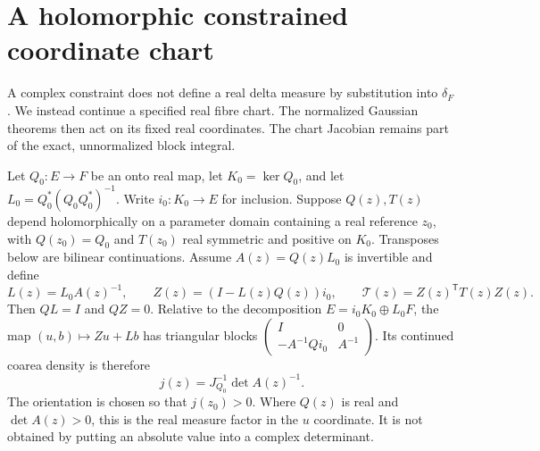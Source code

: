 \documentclass[11pt,letterpaper,reqno]{amsart}
\numberwithin{equation}{section}
\theoremstyle{definition}
\theoremstyle{remark}
\begin{document}
\section{A holomorphic constrained coordinate chart}
\label{gi:sec-complex-chart}

A complex constraint does not define a real delta measure by
substitution into $\delta_F$. We instead continue a specified
real fibre chart. The normalized Gaussian theorems then act on
its fixed real coordinates. The chart Jacobian remains part of
the exact, unnormalized block integral.

Let $Q_0:E\to F$ be an onto real map, let $K_0=\ker Q_0$,
and let $L_0=Q_0^*(Q_0Q_0^*)^{-1}$. Write $i_0:K_0\to E$
for inclusion. Suppose $Q(z),T(z)$ depend holomorphically
on a parameter domain containing a real reference $z_0$,
with $Q(z_0)=Q_0$ and $T(z_0)$ real symmetric and positive
on $K_0$. Transposes below are bilinear continuations.
Assume $A(z)=Q(z)L_0$ is invertible and define
\begin{equation}\label{gi:eq-complex-fibre-chart}
 L(z)=L_0A(z)^{-1},\qquad
 Z(z)=(I-L(z)Q(z))i_0,\qquad
 \mathcal T(z)=Z(z)^{\mathsf T}T(z)Z(z).
\end{equation}
Then $QL=I$ and $QZ=0$. Relative to the decomposition
$E=i_0K_0\oplus L_0F$, the map $(u,b)\mapsto Zu+Lb$
has triangular blocks
$\left(\begin{smallmatrix}I&0\\-A^{-1}Qi_0&A^{-1}\end{smallmatrix}\right)$.
Its continued coarea density is therefore
\begin{equation}\label{gi:eq-complex-coarea-density}
             j(z)=J_{Q_0}^{-1}\det A(z)^{-1}.
\end{equation}
The orientation is chosen so that $j(z_0)>0$. Where $Q(z)$ is real
and $\det A(z)>0$, this is
the real measure factor in the $u$ coordinate. It is not
obtained by putting an absolute value into a complex determinant.
\end{document}
